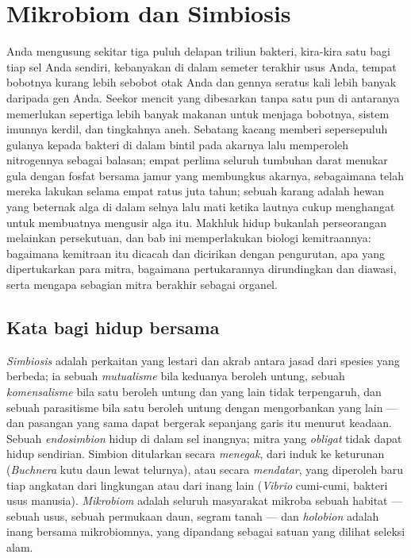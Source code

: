 \chapter{Mikrobiom dan Simbiosis}\label{ch:b3:microbiomes}

Anda mengusung sekitar tiga puluh delapan triliun bakteri, kira-kira satu bagi
tiap sel Anda sendiri, kebanyakan di dalam semeter terakhir usus Anda, tempat
bobotnya kurang lebih sebobot otak Anda dan gennya seratus kali lebih banyak
daripada gen Anda. Seekor mencit yang dibesarkan tanpa satu pun di antaranya
memerlukan sepertiga lebih banyak makanan untuk menjaga bobotnya, sistem
imunnya kerdil, dan tingkahnya aneh. Sebatang kacang memberi sepersepuluh
gulanya kepada bakteri di dalam bintil pada akarnya lalu memperoleh nitrogennya
sebagai balasan; empat perlima seluruh tumbuhan darat menukar gula dengan
fosfat bersama jamur yang membungkus akarnya, sebagaimana telah mereka lakukan
selama empat ratus juta tahun; sebuah karang adalah hewan yang beternak alga di
dalam selnya lalu mati ketika lautnya cukup menghangat untuk membuatnya
mengusir alga itu. Makhluk hidup bukanlah perseorangan melainkan persekutuan,
dan bab ini memperlakukan biologi kemitraannya: bagaimana kemitraan itu dicacah
dan dicirikan dengan pengurutan, apa yang dipertukarkan para mitra, bagaimana
pertukarannya dirundingkan dan diawasi, serta mengapa sebagian mitra berakhir
sebagai organel.

\section{Kata bagi hidup bersama}

\begin{definition}[Simbiosis]\label{def:b3:microbiomes:symbiosis}
%
\emph{Simbiosis} adalah perkaitan yang lestari dan akrab antara jasad dari
spesies yang berbeda; ia sebuah \emph{mutualisme} bila keduanya beroleh
untung, sebuah \emph{komensalisme} bila satu beroleh untung dan yang lain tidak
terpengaruh, dan sebuah parasitisme bila satu beroleh untung dengan mengorbankan
yang lain --- dan pasangan yang sama dapat bergerak sepanjang garis itu menurut
keadaan. Sebuah \emph{endosimbion} hidup di dalam sel inangnya; mitra yang
\emph{obligat} tidak dapat hidup sendirian. Simbion ditularkan secara
\emph{menegak}, dari induk ke keturunan (\emph{Buchnera} kutu daun lewat
telurnya), atau secara \emph{mendatar}, yang diperoleh baru tiap angkatan dari
lingkungan atau dari inang lain (\emph{Vibrio} cumi-cumi, bakteri usus manusia).
\emph{Mikrobiom} adalah seluruh masyarakat mikroba sebuah habitat --- sebuah
usus, sebuah permukaan daun, segram tanah --- dan \emph{holobion} adalah inang
bersama mikrobiomnya, yang dipandang sebagai satuan yang dilihat seleksi alam.
\end{definition}

